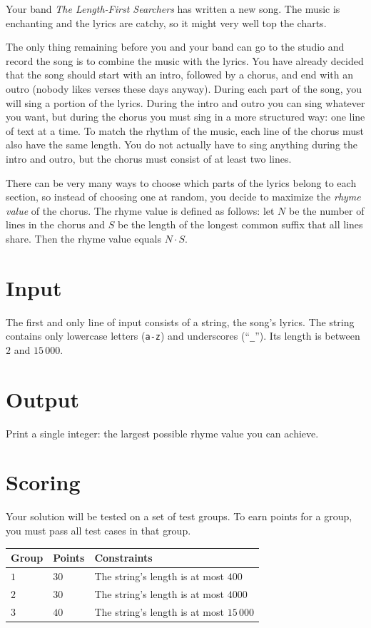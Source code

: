 Your band \emph{The Length-First Searchers} has written a new song.
The music is enchanting and the lyrics are catchy, so it might very well top the charts.

The only thing remaining before you and your band can go to the studio and record the song is to combine the music with the lyrics.
You have already decided that the song should start with an intro, followed by a chorus, and end with an outro (nobody likes verses these days anyway).
During each part of the song, you will sing a portion of the lyrics.
During the intro and outro you can sing whatever you want, but during the chorus you must sing in a more structured way: one line of text at a time.
To match the rhythm of the music, each line of the chorus must also have the same length.
You do not actually have to sing anything during the intro and outro, but the chorus must consist of at least two lines.

There can be very many ways to choose which parts of the lyrics belong to each section, so instead of choosing one at random, you decide to maximize the \emph{rhyme value} of the chorus.
The rhyme value is defined as follows: let $N$ be the number of lines in the chorus and $S$ be the length of the longest common suffix that all lines share.
Then the rhyme value equals $N \cdot S$.

\section*{Input}
The first and only line of input consists of a string, the song's lyrics.
The string contains only lowercase letters (\texttt{a-z}) and underscores (``\texttt{\_}'').
Its length is between $2$ and $15\,000$.

\section*{Output}
Print a single integer: the largest possible rhyme value you can achieve.

\section*{Scoring}
Your solution will be tested on a set of test groups.
To earn points for a group, you must pass all test cases in that group.

\noindent
\begin{tabular}{| l | l | l |}
\hline
Group & Points & Constraints \\ \hline
$1$   & $30$       & The string's length is at most $400$ \\ \hline
$2$   & $30$       & The string's length is at most $4000$ \\ \hline
$3$   & $40$       & The string's length is at most $15\,000$ \\ \hline
\end{tabular}
